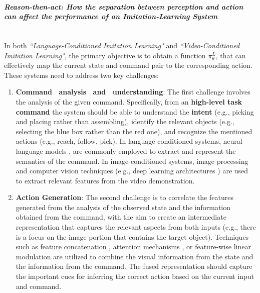 \paragraph{\textit{Reason-then-act: How the separation between perception and action can affect the performance of an Imitation-Learning System}} \mbox{} \\
In both \textit{``Language-Conditioned Imitation Learning"} and \textit{``Video-Conditioned Imitation Learning"}, the primary objective is to obtain a function $\pi_{\theta}^{L}$, that can effectively map the current state and command pair to the corresponding action. These systems need to address two key challenges:
\begin{enumerate}
    \item \textbf{Command \ analysis \ and \ understanding}: The first challenge involves the
          analysis of the given command. Specifically, from an \textbf{high-level task command} the system should be able to understand the \textbf{intent} (e.g., picking and placing rather than assembling), identify the relevant objects (e.g., selecting the blue box rather than the red one), and recognize the mentioned actions (e.g., reach, follow, pick). In language-conditioned systems, neural language models \cite{stepputtis2020language,jang2022bc_z,brohan2022rt}, are commonly employed to extract and represent the semantics of the command. In image-conditioned systems, image processing and computer vision techniques (e.g., deep learning architectures \cite{dasari2021transformers_one_shot,mandi2022towards_more_generalizable_one_shot}) are used to extract relevant features from the video demonstration.
    \item \textbf{Action Generation}: The second challenge is to correlate the features generated from the analysis of the observed state and the information obtained from the command, with the aim to create an intermediate representation that captures the relevant aspects from both inputs (e.g., there is a focus on the image portion that contains the target object). Techniques such as feature concatenation \cite{james2018task_embedded,stepputtis2020language,bhutani2022attentive_one_shot}, attention mechanisms \cite{dasari2021transformers_one_shot,mandi2022towards_more_generalizable_one_shot}, or feature-wise linear modulation \cite{brohan2022rt} are utilized to combine the visual information from the state and the information from the command. The fused representation should capture the important cues for inferring the correct action based on the current input and command.
\end{enumerate}
